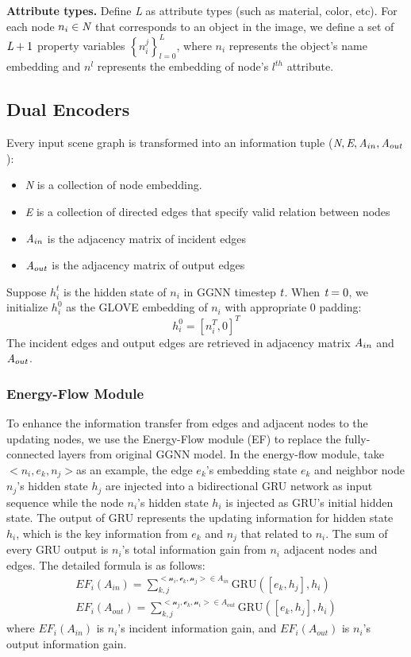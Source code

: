 \documentclass[letterpaper]{article} %
\begin{document}
\textbf{Attribute types.} Define \emph{L} as attribute types (such as material, color, etc). For each node $n_i\in\emph{N}$ that corresponds to an object in the
image, we define a set of $\emph{L}+1$ property variables ${\left\{ n_i^j\right\}}_{l=0}^L$, where $n_i$ represents the object's name embedding and $n^l$ represents the embedding of node's $l^{th}$ attribute.

\subsection{Dual Encoders}

Every input scene graph is transformed into an information tuple ($\emph{N}, \emph{E}, \emph{A}_{in}, \emph{A}_{out}$):
\begin{itemize}
    \item \emph{N} is a collection of node embedding.
    \item \emph{E} is a collection of directed edges that specify valid relation between nodes
    \item $\emph{A}_{in}$ is the adjacency matrix of incident edges
    \item $\emph{A}_{out}$ is the adjacency matrix of output edges
\end{itemize}
Suppose $h_i^t$ is the hidden state of $n_i$ in GGNN timestep $\emph{t}$. When $\emph{t}=0$, we initialize $h_i^0$ as the GLOVE embedding of $n_i$ with appropriate 0 padding:
\begin{equation}
    h_i^0 = [n_i^T, 0]^T 
\end{equation}
The incident edges and output edges are retrieved in adjacency matrix $\emph{A}_{in}$ and $\emph{A}_{out}$. 

\subsubsection{Energy-Flow Module}
To enhance the information transfer from edges and adjacent nodes to the updating nodes, we use the Energy-Flow module (EF) to replace the fully-connected layers from original GGNN model. In the energy-flow module, take $<{n}_i, {e}_k, {n}_j>$as an example, the edge ${e}_k$'s embedding state $e_k$ and neighbor node  ${n}_j$'s hidden state $h_j$ are injected into a bidirectional GRU network as input sequence while the node ${n}_i$'s hidden state $h_i$ is injected as GRU's initial hidden state. The output of GRU represents the updating information for hidden state $h_i$, which is the key information from ${e}_k$ and ${n}_j$ that related to ${n}_i$. The sum of every GRU output is ${n}_i$'s total information gain from ${n}_i$ adjacent nodes and edges. The detailed formula is as follows:
\begin{gather}
    EF_i(A_{in}) = \sum\limits_{k,j}^{<\mathcal{n}_i,\mathcal{e}_k,\mathcal{n}_j>\in A_{in}} \text{GRU}([e_k, h_j], h_i) \\
    EF_i(A_{out}) = \sum\limits_{k,j}^{<\mathcal{n}_j,\mathcal{e}_k,\mathcal{n}_i>\in A_{out}} \text{GRU}([e_k, h_j], h_i)
\end{gather}
where $EF_i(A_{in})$ is ${n}_i$'s incident information gain, and  $EF_i(A_{out})$ is ${n}_i$'s output information gain.
\end{document}
